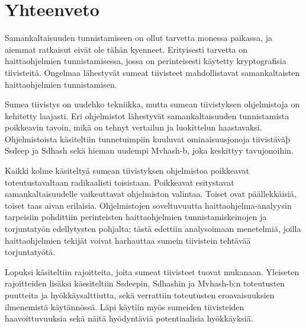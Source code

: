 \chapter{Yhteenveto\label{summary}}
Samankaltaisuuden
tunnistamiseen on ollut tarvetta monessa paikassa,
ja aiemmat ratkaisut eivät ole tähän kyenneet. Erityisesti
tarvetta on haittaohjelmien tunnistamisessa, jossa on perinteisesti
käytetty kryptografisia tiivisteitä. Ongelmaa lähestyvät
sumeat tiivisteet mahdollistavat samankaltaisten haittaohjelmien
tunnistamisen.

Sumea tiivistys on uudehko tekniikka, mutta sumean tiivistyksen
ohjelmistoja on kehitetty laajasti. Eri ohjelmistot lähestyvät
samankaltaisuuden tunnistamista poikkeavin tavoin, mikä on tehnyt
vertailun ja luokittelun haastavaksi. Ohjelmistoista käsiteltiin
tunnetuimpiin kuuluvat ominaisuusjonoja tiivistäväþ Ssdeep ja Sdhash
sekä hieman uudempi Mvhash-b, joka keskittyy tavujonoihin.

Kaikki kolme käsiteltyä sumean tiivistyksen ohjelmistoa poikkeavat
toteutustavaltaan radikaalisti toisistaan. Poikkeavat esitystavat
samankaltaisuudelle vaikeuttavat ohjelmiston valintaa. Toiset
ovat päällekkäisiä, toiset taas aivan erilaisia. Ohjelmistojen
soveltuvuutta haittaohjelma-analyysin tarpeisiin pohdittiin
perinteisten haittaohjelmien tunnistamiskeinojen ja torjuntatyön
edellytysten pohjalta; tästä edettiin analysoimaan menetelmiä, joilla
haittaohjelmien tekijät voivat harhauttaa sumein tiivistein
tehtävää torjuntatyötä.

Lopuksi käsiteltiin rajoitteita, joita sumeat tiivisteet
tuovat mukanaan. Yleiseten rajoitteiden lisäksi
käesiteltiin Ssdeepin, Sdhashin ja Mvhash-b:n
toteutusten puutteita ja hyökkäysalttiutta, sekä
verrattiin toteutusten eroavaisuuksien ilmenemistä
käytännössä. Läpi käytiin myös sumeiden tiivisteiden
haavoittuvuuksia sekä näitä hyödyntäviä potentiaalisia
hyökkäyksiä.
